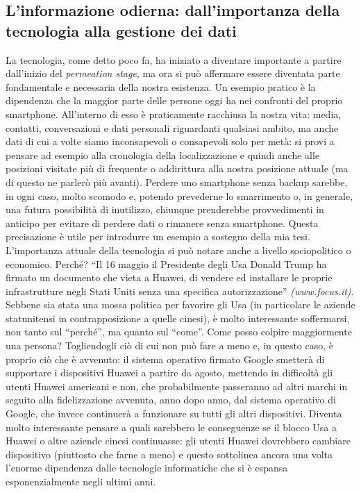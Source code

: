 \subsection*{L’informazione odierna: dall’importanza della tecnologia alla gestione dei dati}

La tecnologia, come detto poco fa, ha iniziato a diventare importante a partire dall’inizio del \textit{permeation stage}, ma ora si può affermare essere diventata parte fondamentale e necessaria della nostra esistenza.
Un esempio pratico è la dipendenza che la maggior parte delle persone oggi ha nei confronti del proprio smartphone. All’interno di esso è praticamente racchiusa la nostra vita: media, contatti, conversazioni e dati personali riguardanti qualsiasi ambito, ma anche dati di cui a volte siamo inconsapevoli o consapevoli solo per metà: si provi a pensare ad esempio alla cronologia della localizzazione e quindi anche alle posizioni visitate più di frequente o addirittura alla nostra posizione attuale (ma di questo ne parlerò più avanti). Perdere uno smartphone senza backup sarebbe, in ogni caso, molto scomodo e, potendo prevederne lo smarrimento o, in generale, una futura possibilità di inutilizzo, chiunque prenderebbe provvedimenti in anticipo per evitare di perdere dati o rimanere senza smartphone. 
Questa precisazione è utile per introdurre un esempio a sostegno della mia tesi. 
L’importanza attuale della tecnologia si può notare anche a livello sociopolitico o economico. Perché? “Il 16 maggio il Presidente degli Usa Donald Trump ha firmato un documento che vieta a Huawei, di vendere ed installare le proprie infrastrutture negli Stati Uniti senza una specifica autorizzazione” \textit{(www.focus.it)}. Sebbene sia stata una mossa politica per favorire gli Usa (in particolare le aziende statunitensi in contrapposizione a quelle cinesi), è molto interessante soffermarsi, non tanto sul “perché”, ma quanto sul “come”. Come posso colpire maggiormente una persona? Togliendogli ciò di cui non può fare a meno e, in questo caso, è proprio ciò che è avvenuto: il sistema operativo firmato Google smetterà di supportare i dispositivi Huawei a partire da agosto, mettendo in difficoltà gli utenti Huawei americani e non, che probabilmente passeranno ad altri marchi in seguito alla fidelizzazione avvenuta, anno dopo anno, dal sistema operativo di Google, che invece continuerà a funzionare su tutti gli altri dispositivi.
Diventa molto interessante pensare a quali sarebbero le conseguenze se il blocco Usa a Huawei o altre aziende cinesi continuasse: gli utenti Huawei dovrebbero cambiare dispositivo (piuttosto che farne a meno) e questo sottolinea ancora una volta l’enorme dipendenza dalle tecnologie informatiche che si è espansa esponenzialmente negli ultimi anni.
